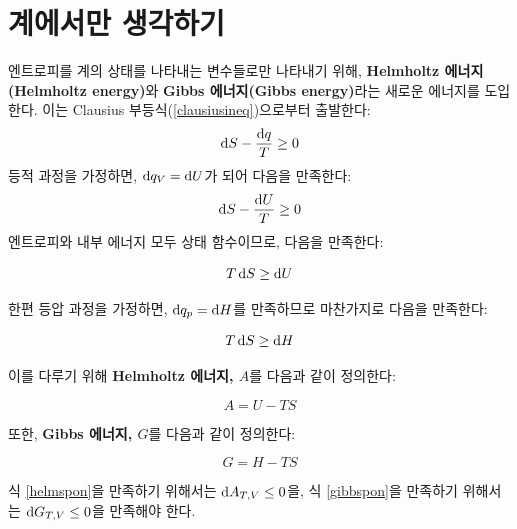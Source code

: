     \section{계에서만 생각하기}\label{ch3sub4}
        \hspace{\parindent} 엔트로피를 계의 상태를 나타내는 변수들로만 나타내기 위해, \textbf{Helmholtz 에너지(Helmholtz energy)}와 \textbf{Gibbs 에너지(Gibbs energy)}라는 새로운 
        에너지를 도입한다. 이는 Clausius 부등식(\ref{clausiusineq})으로부터 출발한다:
        \begin{equation*}
            \operatorname{d\!} S - \frac{\operatorname{d\!} q}{T} \geq 0
        \end{equation*}
        등적 과정을 가정하면, $\operatorname{d\!} q_V = \operatorname{d\!} U$가 되어 다음을 만족한다:
        \begin{equation*}
            \operatorname{d\!} S - \frac{\operatorname{d\!} U}{T} \geq 0
        \end{equation*}
        엔트로피와 내부 에너지 모두 상태 함수이므로, 다음을 만족한다:
        \begin{cor}\label{helmspon}
        \begin{equation*}
            T \operatorname{d\!} S \geq \operatorname{d\!} U
        \end{equation*}
        \end{cor}
        한편 등압 과정을 가정하면, $\operatorname{d\!} q_p = \operatorname{d\!} H$를 만족하므로 마찬가지로 다음을 만족한다:
        \begin{cor}\label{gibbspon}
        \begin{equation*}
            T \operatorname{d\!} S \geq \operatorname{d\!} H
        \end{equation*}
        \end{cor}
        이를 다루기 위해 \textbf{Helmholtz 에너지, $A$}를 다음과 같이 정의한다:
        \begin{defn}
        \begin{equation*}
            A = U - TS
        \end{equation*}
        \end{defn}
        또한, \textbf{Gibbs 에너지, $G$}를 다음과 같이 정의한다:
        \begin{defn}
        \begin{equation*}
            G = H - TS
        \end{equation*}
        \end{defn}
        \par 식 \ref{helmspon}을 만족하기 위해서는 $\operatorname{d\!} A_{T,V} \leq 0$을, 식 \ref{gibbspon}을 만족하기 위해서는 $\operatorname{d\!} G_{T,V} \leq 0$을 만족해야 한다. 
